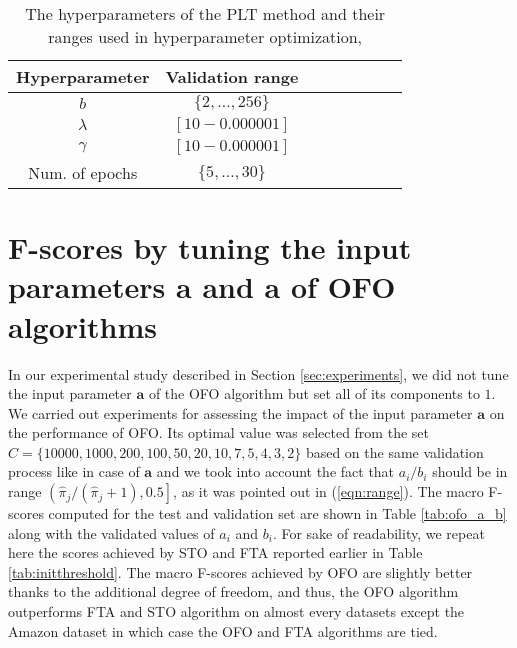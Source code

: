 \documentclass{article}
\newcommand{\Algo}[1]{\textsc{#1}}
\newcommand{\ba}{\mathbf{a}}
\newcommand{\bb}{\mathbf{a}}
\newcommand{\tableBefore}{-0pt}
\newcommand{\tableAfter}{-0pt}
\begin{document}
\vspace{\tableBefore}
\begin{table}[ht!]
\caption{The hyperparameters of the \Algo{PLT} method and their ranges used in hyperparameter optimization,}
\label{tab:hyppar}
\begin{center}
\begin{tabular}{|c|c|c|c|c|c|c|c|}
\hline
Hyperparameter & Validation range \\%
\hline
$b$ & $\{2,\dots,256\}$ \\%
$\lambda$ &  $[10 - 0.000001]$ \\%
$\gamma$ &  $[10 - 0.000001]$ \\%
Num. of epochs &  $\{ 5, \dots , 30\} $ \\
\hline
\end{tabular}
\end{center}
\end{table}
\vspace{\tableAfter}




\section{F-scores by tuning the input parameters $\ba$ and $\bb$ of \Algo{OFO} algorithms}
\label{sec:OFO_a_b}

In our experimental study described in Section \ref{sec:experiments}, we did not tune the input parameter $\ba$ of the \Algo{OFO} algorithm but set all of its components to $1$. We carried out experiments for assessing the impact of the input parameter $\ba$ on the performance of \Algo{OFO}. Its optimal value was selected from the set $C = \{10000,1000,200,100,50,20,10,7,5,4,3,2\}$ based on the same validation process like in case of $\bb$ and we took into account the fact that $a_i /b_i$ should be in range $\left (\hat\pi_j / (\hat\pi_j + 1), 0.5 \right ]$, as it was pointed out in (\ref{eqn:range}). The macro F-scores computed for the test and validation set are shown in Table \ref{tab:ofo_a_b} along with the validated values of $a_i$ and $b_i$. For sake of readability, we repeat here the scores achieved by \Algo{STO} and \Algo{FTA} reported earlier in Table \ref{tab:initthreshold}. The macro F-scores achieved by \Algo{OFO} are slightly better thanks to the additional degree of freedom, and thus, the \Algo{OFO} algorithm outperforms \Algo{FTA} and \Algo{STO} algorithm on almost every datasets except the Amazon dataset in which case the \Algo{OFO} and \Algo{FTA} algorithms are tied.
\end{document}
